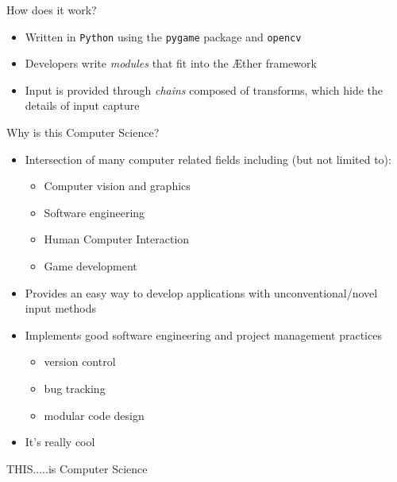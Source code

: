 \documentclass{beamer}
\begin{document}
\begin{frame}{How does it work?}

\begin{itemize}
\item Written in {\tt Python} using the {\tt pygame} package and {\tt opencv}
\item Developers write {\it modules} that fit into the {\AE}ther framework
\item Input is provided through {\it chains} composed of transforms, which hide the details of input capture
\end{itemize}

\end{frame}



\begin{frame}{Why is this Computer Science?}

\begin{itemize}
\item Intersection of many computer related fields including (but not limited to):
\begin{itemize}
\item Computer vision and graphics
\item Software engineering
\item Human Computer Interaction
\item Game development
\end{itemize}
\item Provides an easy way to develop applications with unconventional/novel input methods
\item Implements good software engineering and project management practices
\begin{itemize}
\item version control
\item bug tracking
\item modular code design
\end{itemize}
\item It's really cool

\end{itemize}

\end{frame}



\begin{frame}

\begin{center}
\huge
THIS.....is Computer Science
\end{center}

\end{frame}
\end{document}
